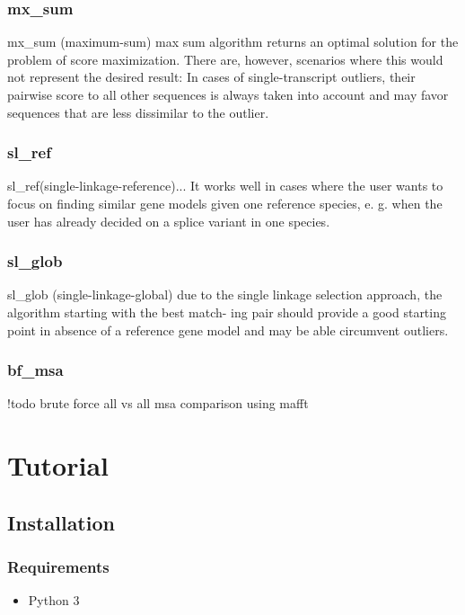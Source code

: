 \documentclass[letterpaper,10pt,english]{sphinxmanual}
\begin{document}
\subsection{mx\_sum}
\label{Introduction:id1}\label{Introduction:mx-sum}
mx\_sum (maximum-sum)
max sum algorithm returns an optimal solution for the problem of score maximization.
There are, however, scenarios where this would not represent the desired result: In cases of single-transcript outliers,
their pairwise score to all other sequences is always taken into account and may favor sequences that are less dissimilar to the outlier.


\subsection{sl\_ref}
\label{Introduction:sl-ref}\label{Introduction:id2}
sl\_ref(single-linkage-reference)...
It works well in cases where the user wants to
focus on finding similar gene models given one reference species, e. g. when the user
has already decided on a splice variant in one species.


\subsection{sl\_glob}
\label{Introduction:sl-glob}
sl\_glob (single-linkage-global) due to the single linkage selection approach, the algorithm starting with the best match-
ing pair should provide a good starting point in absence of a reference gene model and
may be able circumvent outliers.


\subsection{bf\_msa}
\label{Introduction:bf-msa}
!todo
brute force all vs all msa comparison using mafft


\chapter{Tutorial}
\label{Tutorial::doc}\label{Tutorial:tutorial}\label{Tutorial:id1}

\section{Installation}
\label{Tutorial:installation}

\subsection{Requirements}
\label{Tutorial:requirements}\begin{itemize}
\item {} 
Python 3

\end{itemize}
\end{document}

